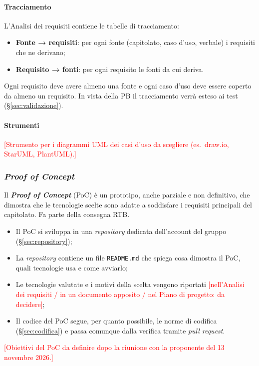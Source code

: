 \documentclass[12pt,a4paper]{article}
\newcommand{\ph}[1]{\textcolor{red}{[#1]}}
\newcommand{\tightlist}{\setlength{\itemsep}{1pt}\setlength{\parskip}{0pt}}
\begin{document}
\paragraph{Tracciamento}
L'Analisi dei requisiti contiene le tabelle di tracciamento:
\begin{itemize}
\tightlist
\item \textbf{Fonte → requisiti}: per ogni fonte (capitolato, caso d'uso, verbale) i requisiti che ne derivano;
\item \textbf{Requisito → fonti}: per ogni requisito le fonti da cui deriva.
\end{itemize}
Ogni requisito deve avere almeno una fonte e ogni caso d'uso deve essere coperto da almeno un requisito. In vista della PB il tracciamento verrà esteso ai test (§\ref{sec:validazione}).

\paragraph{Strumenti}
\ph{Strumento per i diagrammi UML dei casi d'uso da scegliere (es.\ draw.io, StarUML, PlantUML).}

\subsubsection{\emph{Proof of Concept}}\label{sec:poc}
Il \textbf{\emph{Proof of Concept}} (PoC) è un prototipo, anche parziale e non definitivo, che dimostra che le tecnologie scelte sono adatte a soddisfare i requisiti principali del capitolato. Fa parte della consegna RTB.
\begin{itemize}
\tightlist
\item Il PoC si sviluppa in una \emph{repository} dedicata dell'account del gruppo (§\ref{sec:repository});
\item La \emph{repository} contiene un file \texttt{README.md} che spiega cosa dimostra il PoC, quali tecnologie usa e come avviarlo;
\item Le tecnologie valutate e i motivi della scelta vengono riportati \ph{nell'Analisi dei requisiti / in un documento apposito / nel Piano di progetto: da decidere};
\item Il codice del PoC segue, per quanto possibile, le norme di codifica (§\ref{sec:codifica}) e passa comunque dalla verifica tramite \emph{pull request}.
\end{itemize}
\ph{Obiettivi del PoC da definire dopo la riunione con la proponente del 13 novembre 2026.}
\end{document}
